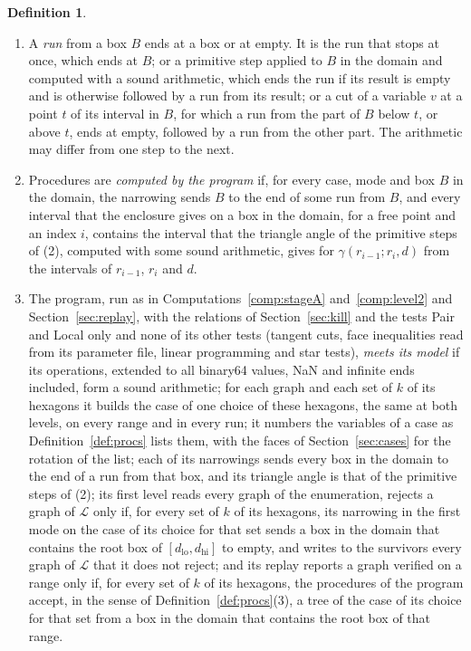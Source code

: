 \documentclass[12pt]{amsart}
\theoremstyle{definition}
\newtheorem{definition}[theorem]{Definition}
\theoremstyle{plain}
\theoremstyle{definition}
\newcommand{\dlo}{d_{\mathrm{lo}}}
\newcommand{\dhi}{d_{\mathrm{hi}}}
\begin{document}
\begin{definition}
\begin{enumerate}
\item A \emph{run} from a box $B$ ends at a box or at empty. It is the run that stops at once, which ends at $B$; or a primitive step applied to $B$ in the domain and computed with a sound arithmetic, which ends the run if its result is empty and is otherwise followed by a run from its result; or a cut of a variable $v$ at a point $t$ of its interval in $B$, for which a run from the part of $B$ below $t$, or above $t$, ends at empty, followed by a run from the other part. The arithmetic may differ from one step to the next.
\item Procedures are \emph{computed by the program} if, for every case, mode and box $B$ in the domain, the narrowing sends $B$ to the end of some run from $B$, and every interval that the enclosure gives on a box in the domain, for a free point and an index $i$, contains the interval that the triangle angle of the primitive steps of (2), computed with some sound arithmetic, gives for $\gamma(r_{i-1};r_i,d)$ from the intervals of $r_{i-1}$, $r_i$ and $d$.
\item The program, run as in Computations~\ref{comp:stageA} and~\ref{comp:level2} and Section~\ref{sec:replay}, with the relations of Section~\ref{sec:kill} and the tests Pair and Local only and none of its other tests (tangent cuts, face inequalities read from its parameter file, linear programming and star tests), \emph{meets its model} if its operations, extended to all binary64 values, NaN and infinite ends included, form a sound arithmetic; for each graph and each set of $k$ of its hexagons it builds the case of one choice of these hexagons, the same at both levels, on every range and in every run; it numbers the variables of a case as Definition~\ref{def:procs} lists them, with the faces of Section~\ref{sec:cases} for the rotation of the list; each of its narrowings sends every box in the domain to the end of a run from that box, and its triangle angle is that of the primitive steps of (2); its first level reads every graph of the enumeration, rejects a graph of $\mathcal L$ only if, for every set of $k$ of its hexagons, its narrowing in the first mode on the case of its choice for that set sends a box in the domain that contains the root box of $[\dlo,\dhi]$ to empty, and writes to the survivors every graph of $\mathcal L$ that it does not reject; and its replay reports a graph verified on a range only if, for every set of $k$ of its hexagons, the procedures of the program accept, in the sense of Definition~\ref{def:procs}(3), a tree of the case of its choice for that set from a box in the domain that contains the root box of that range.
\end{enumerate}
\end{definition}
\end{document}
